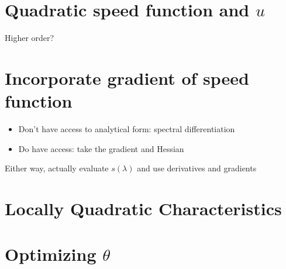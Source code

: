 \documentclass[eikonal.tex]{subfiles}
\begin{document}
\section{Quadratic speed function and $u$}

Higher order?

\section{Incorporate gradient of speed function}

\begin{itemize}
\item Don't have access to analytical form: spectral differentiation
\item Do have access: take the gradient and Hessian
\end{itemize}
Either way, actually evaluate $s(\lambda)$ and use derivatives and
gradients

\section{Locally Quadratic Characteristics}


\section{Optimizing $\theta$}
\end{document}
